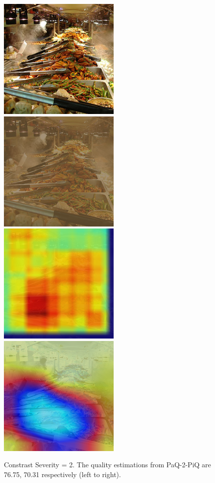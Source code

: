 \documentclass[10pt,twocolumn,letterpaper]{article}
\begin{document}
\begin{figure}[!ht]
	\includegraphics[width=.49\columnwidth]{Images/test_images/severity=0/buffet.png}\hfill
	\includegraphics[width=.49\columnwidth]{Images/test_images/severity=2/contrast/buffet.png}\hfill
	\\[\smallskipamount]
    \includegraphics[width=.49\columnwidth]{Images/saliency_maps/paq2piq/severity=2/contrast/buffet.png}\hfill
	\includegraphics[width=.49\columnwidth]{Images/saliency_maps/resnet18/severity=2/contrast/buffet.png}\hfill
	\caption{Constrast Severity = 2. The quality estimations from PaQ-2-PiQ are 76.75, 70.31 respectively (left to right).}
\end{figure}
\end{document}
